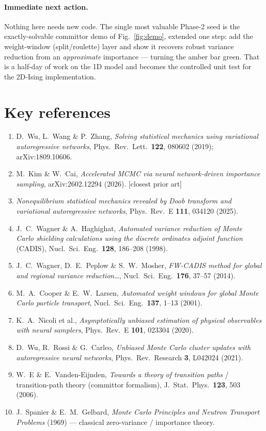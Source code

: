 \documentclass[11pt]{article}
\begin{document}
\paragraph{Immediate next action.} Nothing here needs new code. The single most valuable
Phase-2 seed is the exactly-solvable committor demo of Fig.~\ref{fig:demo}, extended one
step: add the weight-window (split/roulette) layer and show it recovers robust variance
reduction from an \emph{approximate} importance --- turning the amber bar green. That is a
half-day of work on the 1D model and becomes the controlled unit test for the 2D-Ising
implementation.

\section*{Key references}
\small
\begin{enumerate}[itemsep=1pt]
\item D.\ Wu, L.\ Wang \& P.\ Zhang, \emph{Solving statistical mechanics using variational autoregressive networks}, Phys.\ Rev.\ Lett.\ \textbf{122}, 080602 (2019); arXiv:1809.10606.
\item M.\ Kim \& W.\ Cai, \emph{Accelerated MCMC via neural network-driven importance sampling}, arXiv:2602.12294 (2026). [closest prior art]
\item \emph{Nonequilibrium statistical mechanics revealed by Doob transform and variational autoregressive networks}, Phys.\ Rev.\ E \textbf{111}, 034120 (2025).
\item J.\ C.\ Wagner \& A.\ Haghighat, \emph{Automated variance reduction of Monte Carlo shielding calculations using the discrete ordinates adjoint function} (CADIS), Nucl.\ Sci.\ Eng.\ \textbf{128}, 186--208 (1998).
\item J.\ C.\ Wagner, D.\ E.\ Peplow \& S.\ W.\ Mosher, \emph{FW-CADIS method for global and regional variance reduction\dots}, Nucl.\ Sci.\ Eng.\ \textbf{176}, 37--57 (2014).
\item M.\ A.\ Cooper \& E.\ W.\ Larsen, \emph{Automated weight windows for global Monte Carlo particle transport}, Nucl.\ Sci.\ Eng.\ \textbf{137}, 1--13 (2001).
\item K.\ A.\ Nicoli et al., \emph{Asymptotically unbiased estimation of physical observables with neural samplers}, Phys.\ Rev.\ E \textbf{101}, 023304 (2020).
\item D.\ Wu, R.\ Rossi \& G.\ Carleo, \emph{Unbiased Monte Carlo cluster updates with autoregressive neural networks}, Phys.\ Rev.\ Research \textbf{3}, L042024 (2021).
\item W.\ E \& E.\ Vanden-Eijnden, \emph{Towards a theory of transition paths} / transition-path theory (committor formalism), J.\ Stat.\ Phys.\ \textbf{123}, 503 (2006).
\item J.\ Spanier \& E.\ M.\ Gelbard, \emph{Monte Carlo Principles and Neutron Transport Problems} (1969) --- classical zero-variance / importance theory.
\end{enumerate}
\end{document}
